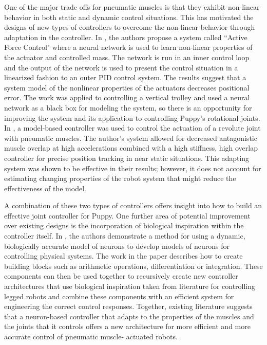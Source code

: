One of the major trade offs for pneumatic muscles is that they exhibit
non-linear behavior in both static and dynamic control situations.
\cite{HuntPMuscles, DynamicPMuscles} This has
motivated the designs of new types of controllers to overcome the non-linear
behavior through adaptation in the controller. In \cite{Jahanabadi2009}, the
authors propose a system called ``Active Force Control" where a neural network
is used to learn non-linear properties of the actuator and controlled mass.
The network is run in an inner control loop and the output of the network is
used to present the control situation in a linearized fashion to an outer PID
control system. The results suggest that a system model of the nonlinear
properties of the actuators decreases positional error. The work was
applied to controlling a vertical trolley and used a neural network as a black
box for modeling the system, so there is an opportunity for improving the
system and its application to controlling Puppy's rotational joints.
In \cite{Wang2013}, a model-based controller was used to control the actuation
of a revolute joint with pneumatic muscles. The author's system allowed for
decreased antagonistic muscle overlap at high accelerations combined with a
high stiffness, high overlap controller for precise position tracking in near
static situations. This adapting system was shown to be effective in their
results; however, it does not account for estimating changing properties of the
robot system that might reduce the effectiveness of the model.

A combination of these two types of controllers offers insight into how to build
an effective joint controller for Puppy. One further area of potential
improvement over existing designs is the incorporation of biological inspiration
within the controller itself. In \cite{NickFunctionalSubnetwork}, the authors
demonstrate a method for using a dynamic, biologically accurate model of neurons
to develop models of neurons for controlling physical systems. The work in the
paper describes how to create building blocks such as arithmetic operations,
differentiation or integration. These components can then be used together to
recursively create new controller architectures that use biological inspiration
taken from literature for controlling legged robots and combine these components with an
efficient system for engineering the correct control responses. Together,
existing literature suggests that a neuron-based controller that adapts to the
properties of the muscles and the joints that it controls offers a new
architecture for more efficient and more accurate control of pneumatic muscle-
actuated robots.

